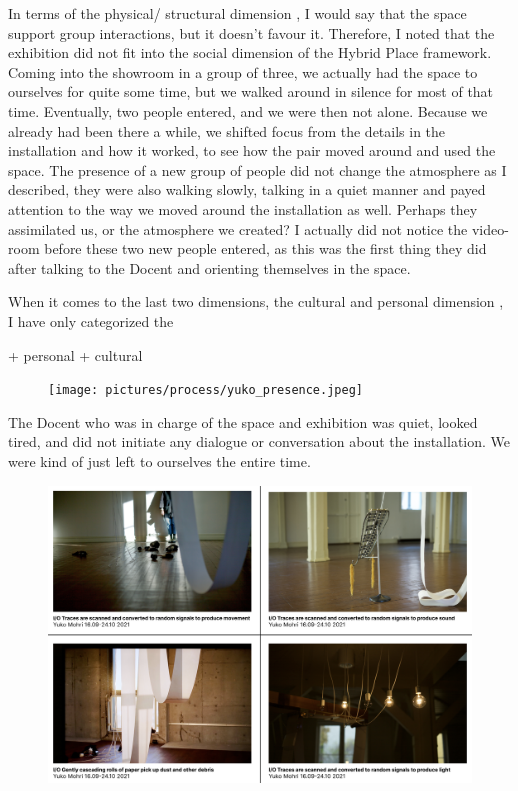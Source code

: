 In terms of the physical/ structural dimension \autocite{hybridplace_ciolfi}, I would say that the space support group interactions, but it doesn't favour it. Therefore, I noted that the exhibition did not fit into the social dimension of the Hybrid Place framework. Coming into the showroom in a group of three, we actually had the space to ourselves for quite some time, but we walked around in silence for most of that time. Eventually, two people entered, and we were then not alone. Because we already had been there a while, we shifted focus from the details in the installation and how it worked, to see how the pair moved around and used the space. The presence of a new group of people did not change the atmosphere as I described, they were also walking slowly, talking in a quiet manner and payed attention to the way we moved around the installation as well. Perhaps they assimilated us, or the atmosphere we created? I actually did not notice the video-room before these two new people entered, as this was the first thing they did after talking to the Docent and orienting themselves in the space.

When it comes to the last two dimensions, the cultural and personal dimension \autocite{hybridplace_ciolfi}, I have only categorized the 

+ personal
+ cultural


\begin{figure}[H]
\texttt{[image: pictures/process/yuko\_presence.jpeg]}
\centering 
\end{figure}

The Docent who was in charge of the space and exhibition was quiet, looked tired, and did not initiate any dialogue or conversation about the installation. We were kind of just left to ourselves the entire time.


\begin{figure}[H]
\includegraphics[width=12cm]{pictures/dataset/yuko_mohri.png}
\centering 
\end{figure}


